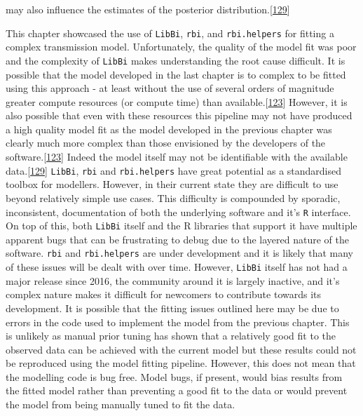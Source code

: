 \documentclass[11pt,twoside]{bristolthesis}
\begin{document}
may also influence the estimates of the posterior distribution.{[}\protect\hyperlink{ref-Lintusaari2016}{129}{]}
  
  This chapter showcased the use of \texttt{LibBi}, \texttt{rbi}, and \texttt{rbi.helpers} for fitting a complex transmission model. Unfortunately, the quality of the model fit was poor and the complexity of \texttt{LibBi} makes understanding the root cause difficult. It is possible that the model developed in the last chapter is to complex to be fitted using this approach - at least without the use of several orders of magnitude greater compute resources (or compute time) than available.{[}\protect\hyperlink{ref-Murray2015}{123}{]} However, it is also possible that even with these resources this pipeline may not have produced a high quality model fit as the model developed in the previous chapter was clearly much more complex than those envisioned by the developers of the software.{[}\protect\hyperlink{ref-Murray2015}{123}{]} Indeed the model itself may not be identifiable with the available data.{[}\protect\hyperlink{ref-Lintusaari2016}{129}{]} \texttt{LibBi}, \texttt{rbi} and \texttt{rbi.helpers} have great potential as a standardised toolbox for modellers. However, in their current state they are difficult to use beyond relatively simple use cases. This difficulty is compounded by sporadic, inconsistent, documentation of both the underlying software and it's \texttt{R} interface. On top of this, both \texttt{LibBi} itself and the R libraries that support it have multiple apparent bugs that can be frustrating to debug due to the layered nature of the software. \texttt{rbi} and \texttt{rbi.helpers} are under development and it is likely that many of these issues will be dealt with over time. However, \texttt{LibBi} itself has not had a major release since 2016, the community around it is largely inactive, and it's complex nature makes it difficult for newcomers to contribute towards its development. It is possible that the fitting issues outlined here may be due to errors in the code used to implement the model from the previous chapter. This is unlikely as manual prior tuning has shown that a relatively good fit to the observed data can be achieved with the current model but these results could not be reproduced using the model fitting pipeline. However, this does not mean that the modelling code is bug free. Model bugs, if present, would bias results from the fitted model rather than preventing a good fit to the data or would prevent the model from being manually tuned to fit the data.
  
\end{document}
